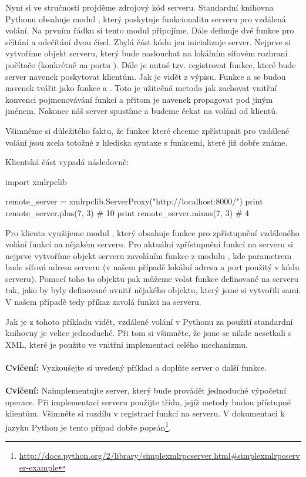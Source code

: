 Nyní si ve stručnosti projděme zdrojový kód serveru. Standardní kniho\-vna Pythonu obsahuje modul , který poskytuje funkcionalitu serveru pro vzdálená volání. Na prvním řádku si tento modul připojíme. Dále definuje dvě funkce pro sčítání a odečítání dvou čísel. Zbylá část kódu jen inicializuje server. Nejprve si vytvoříme objekt serveru, který bude naslouchat na lokálním síťovém rozhraní počítače (kon\-krét\-ně na portu ). Dále je nutné tzv. registrovat funkce, které bude server navenek poskytovat klientům. Jak je vidět z výpisu. Funkce  a  se budou navenek tvářit jako funkce  a . Toto je užitečná metoda jak zachovat vnitřní konvenci pojmenovávání funkcí a přitom je navenek propagovat pod jiným jménem. Nakonec náš server spustíme a budeme čekat na volání od klientů.

Všimněme si důležitého faktu, že funkce které chceme zpřístupnit pro vzdálené volání jsou zcela totožné z hlediska syntaxe s funkcemi, které již dobře známe.

Klientská část vypadá následovně:

\begin{python}
import xmlrpclib

remote_server = xmlrpclib.ServerProxy("http://localhost:8000/")
print remote_server.plus(7, 3) # 10
print remote_server.minus(7, 3) # 4
\end{python}

Pro klienta využijeme modul , který obsahuje funkce pro zpřístupnění vzdáleného volání funkcí na nějakém serveru. Pro aktuální zpřístupnění funkcí na serveru si nejprve vytvoříme objekt serveru zavoláním funkce  z modulu , kde parametrem bude síťová adresa serveru (v našem případě lokální adresa a port použitý v kódu serveru). Pomocí toho to objektu pak můžeme volat funkce definované na serveru tak, jako by byly definované uvnitř nějakého objektu, který jsme si vytvořili sami. V našem případě tedy příkaz  zavolá funkci  na serveru.

Jak je z tohoto příkladu vidět, vzdálené volání v Pythonu za použití standardní knihovny je velice jednoduché. Při tom si všimněte, že jsme se nikde nesetkali s XML, které je použito ve vnitřní implementaci celého mechanizmu.
\\
\\
\noindent
{\textbf{Cvičení:}}
Vyzkoušejte si uvedený příklad a doplňte server o další funkce.
\\
\\
\noindent
{\textbf{Cvičení:}}
Naimplementujte server, který bude provádět jednoduché vý\-počet\-ní operace. Při implementaci serveru použijte třídu, jejíž metody budou přístupné klientům. Všimněte si rozdílu v registraci funkcí na serveru. V dokumentaci k jazyku Python je tento případ dobře popsán\footnote{\url{http://docs.python.org/2/library/simplexmlrpcserver.html#simplexmlrpcserver-example}}.


